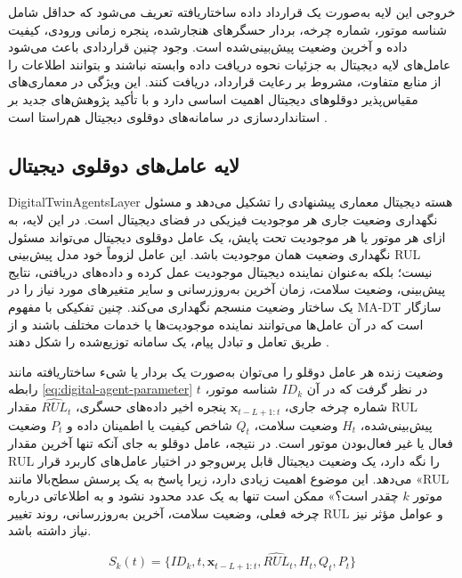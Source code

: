 خروجی این لایه به‌صورت یک قرارداد داده ساختاریافته تعریف می‌شود که حداقل شامل شناسه موتور، شماره چرخه، بردار حسگرهای هنجارشده، پنجره زمانی ورودی، کیفیت داده و آخرین وضعیت پیش‌بینی‌شده است. وجود چنین قراردادی باعث می‌شود عامل‌های لایه دیجیتال به جزئیات نحوه دریافت داده وابسته نباشند و بتوانند اطلاعات را از منابع متفاوت، مشروط بر رعایت قرارداد، دریافت کنند. این ویژگی در معماری‌های مقیاس‌پذیر دوقلوهای دیجیتال اهمیت اساسی دارد و با تأکید پژوهش‌های جدید بر استانداردسازی در سامانه‌های دوقلوی دیجیتال هم‌راستا است \cite{park2026hybriddt,fu2026genaidt}.


\subsection{لایه عامل‌های دوقلوی دیجیتال}
\label{sec:layer-dt-agents}

\gls{DigitalTwinAgentsLayer} هسته دیجیتال معماری پیشنهادی را تشکیل می‌دهد و مسئول نگهداری وضعیت جاری هر موجودیت فیزیکی در فضای دیجیتال است. در این لایه، به ازای هر موتور یا هر موجودیت تحت پایش، یک عامل دوقلوی دیجیتال می‌تواند مسئول نگهداری وضعیت همان موجودیت باشد. این عامل لزوماً خود مدل پیش‌بینی \gls{RUL} نیست؛ بلکه به‌عنوان نماینده دیجیتال موجودیت عمل کرده و داده‌های دریافتی، نتایج پیش‌بینی، وضعیت سلامت، زمان آخرین به‌روزرسانی و سایر متغیرهای مورد نیاز را در یک ساختار وضعیت منسجم نگهداری می‌کند. چنین تفکیکی با مفهوم \gls{MA-DT} سازگار است که در آن عامل‌ها می‌توانند نماینده موجودیت‌ها یا خدمات مختلف باشند و از طریق تعامل و تبادل پیام، یک سامانه توزیع‌شده را شکل دهند \cite{pretel2022masdt,lopez2024madtwin,wang2024multiagent}.

وضعیت زنده هر عامل دوقلو را می‌توان به‌صورت یک بردار یا شیء ساختاریافته مانند رابطه \eqref{eq:digital-agent-parameter} در نظر گرفت که در آن $ID_k$ شناسه موتور، $t$ شماره چرخه جاری، $\mathbf{x}_{t-L+1:t}$ پنجره اخیر داده‌های حسگری، $\widehat{RUL}_t$ مقدار \gls{RUL} پیش‌بینی‌شده، $H_t$ وضعیت سلامت، $Q_t$ شاخص کیفیت یا اطمینان داده و $P_t$ وضعیت فعال یا غیر فعال‌بودن موتور است. در نتیجه، عامل دوقلو به جای آنکه تنها آخرین مقدار \gls{RUL} را نگه دارد، یک وضعیت دیجیتال قابل پرس‌وجو در اختیار عامل‌های کاربرد قرار می‌دهد. این موضوع اهمیت زیادی دارد، زیرا پاسخ به یک پرسش سطح‌بالا مانند «\gls{RUL} موتور $k$ چقدر است؟» ممکن است تنها به یک عدد محدود نشود و به اطلاعاتی درباره چرخه فعلی، وضعیت سلامت، آخرین به‌روزرسانی، روند تغییر \gls{RUL} و عوامل مؤثر نیز نیاز داشته باشد.

\begin{equation}\label{eq:digital-agent-parameter}
 S_k(t)=\{ID_k,t,\mathbf{x}_{t-L+1:t},\widehat{RUL}_t,H_t,Q_t,P_t\}
\end{equation}


